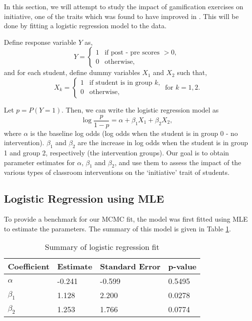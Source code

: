 \documentclass[12pt,a4paper]{article}
\numberwithin{theorem}{section}
\begin{document}
In this section, we will attempt to study the impact of 
gamification exercises on initiative, one of the traits
which was found to have improved in \cite{ang2020gamifying}.
This will be done by fitting a logistic regression model to
the data. 

Define response variable $Y$ as,
\[
Y= \begin{cases} 1 &\mbox{if } \text{post - pre scores }> 0, \\
0  & \mbox{otherwise,}\end{cases}
\]
and for each student, define dummy variables $X_1$ and 
$X_2$ such that, 
\[
X_k= \begin{cases} 1 &\mbox{if } \text{student is in group $k$,} \\
0  & \mbox{otherwise,}\end{cases} \text{ for } k=1,2.
\]

Let $p=P(Y=1)$. Then, we can write the logistic regression
model as 
\[
	\log \frac{p}{1-p} = \alpha + \beta_1 X_1 + \beta_2 X_2,
\]
where $\alpha$ is the baseline log odds (log odds when the
student is in group 0 - no intervention). $\beta_1$ and $\beta_2$ are
the increase in log odds when the student is in group 1
and group 2, respectively (the intervention groups). 
Our goal is to obtain 
parameter estimates for $\alpha$, $\beta_1$ and $\beta_2$,
and use them to assess the impact of the various types
of classroom interventions on the `initiative' trait of
students. 

\subsection{Logistic Regression using MLE}

To provide a benchmark for our MCMC fit, the model was first
fitted using MLE to estimate the parameters. The summary
of this model is given in Table \ref{expt_lr_mle_1}.

\begin{table}[!htbp]
\centering
\begin{tabular}{l|lll}
\hline
Coefficient & Estimate & Standard Error & p-value \\ \hline
$\alpha$    & -0.241   & -0.599         & 0.5495            \\
$\beta_1$   & 1.128    & 2.200          & 0.0278            \\
$\beta_2$   & 1.253    & 1.766          & 0.0774          \\ \hline 
\end{tabular}
\caption{Summary of logistic regression fit \label{expt_lr_mle_1}}
\end{table}
\end{document}
